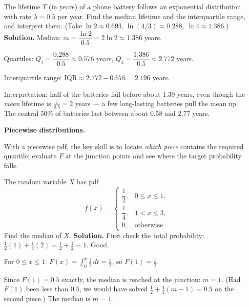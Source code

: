 \documentclass[11pt]{article}
\begin{document}
\begin{exoresolu}
The lifetime $T$ (in years) of a phone battery follows an exponential distribution with rate $\lambda = 0.5$ per year. Find the median lifetime and the interquartile range, and interpret them. (Take $\ln 2 \approx 0.693$, $\ln(4/3) \approx 0.288$, $\ln 4 \approx 1.386$.)
\tcblower
\textbf{Solution.}
Median: $m = \dfrac{\ln 2}{0.5} = 2\ln 2 \approx 1.386$ years.

Quartiles: $Q_1 = \dfrac{0.288}{0.5} \approx 0.576$ years, \quad $Q_3 = \dfrac{1.386}{0.5} \approx 2.772$ years.

Interquartile range: $\mathrm{IQR} \approx 2.772 - 0.576 = 2.196$ years.

Interpretation: half of the batteries fail before about $1.39$ years, even though the \emph{mean} lifetime is $\frac{1}{0.5} = 2$ years --- a few long-lasting batteries pull the mean up. The central $50\%$ of batteries last between about $0.58$ and $2.77$ years.
\end{exoresolu}

\textbf{Piecewise distributions.}\par
With a piecewise pdf, the key skill is to locate \emph{which piece} contains the required quantile: evaluate $F$ at the junction points and see where the target probability falls.

\begin{exoresolu}
The random variable $X$ has pdf
\[ f(x) = \begin{cases} \dfrac{1}{2}, & 0 \le x \le 1, \\[2pt] \dfrac{1}{4}, & 1 < x \le 3, \\[2pt] 0, & \text{otherwise}. \end{cases} \]
Find the median of $X$.
\tcblower
\textbf{Solution.} First check the total probability: $\frac12(1) + \frac14(2) = \frac12 + \frac12 = 1$. Good.

For $0 \le x \le 1$: $F(x) = \int_0^x \frac12\,dt = \frac{x}{2}$, so $F(1) = \frac{1}{2}$.

Since $F(1) = 0.5$ exactly, the median is reached at the junction: $m = 1$. (Had $F(1)$ been less than $0.5$, we would have solved $\frac12 + \frac14(m-1) = 0.5$ on the second piece.) The median is $m = 1$.
\end{exoresolu}
\end{document}
